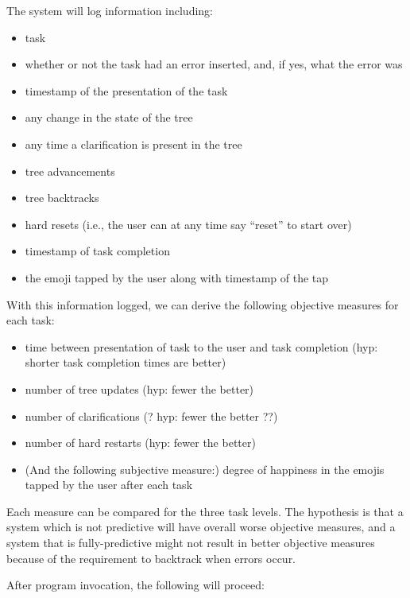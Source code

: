 \documentclass[a4paper,10pt]{article}
\begin{document}
The system will log information including:
\begin{itemize}
 \item task
 \item whether or not the task had an error inserted, and, if yes, what the error was 
 \item timestamp of the presentation of the task
 \item any change in the state of the tree
 \item any time a clarification is present in the tree
 \item tree advancements
 \item tree backtracks
 \item hard resets (i.e., the user can at any time say ``reset'' to start over)
 \item timestamp of task completion
 \item the emoji tapped by the user along with timestamp of the tap
\end{itemize}

With this information logged, we can derive the following objective measures for each task:
\begin{itemize}
 \item time between presentation of task to the user and task completion (hyp: shorter task completion times are better)
 \item number of tree updates (hyp: fewer the better)
 \item number of clarifications (? hyp: fewer the better ??)
 \item number of hard restarts (hyp: fewer the better)
 \item (And the following subjective measure:) degree of happiness in the emojis tapped by the user after each task
\end{itemize}

Each measure can be compared for the three task levels. The hypothesis is that a system which is not predictive will have overall worse objective measures, and a system that is fully-predictive might not result in better objective measures because of the requirement to backtrack when errors occur. 


After program invocation, the following will proceed:
\end{document}
